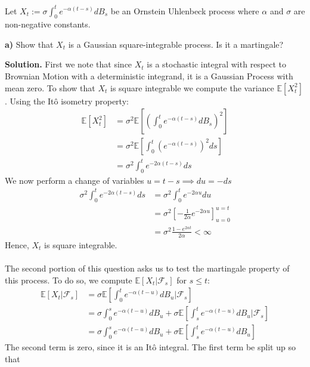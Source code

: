 \documentclass{article}
\begin{document}
\begin{tcolorbox}
[colframe=black,colback=gray!5,boxrule=0.5pt]
 Let $X_t := \sigma\int_0^t e^{-\alpha(t-s)}dB_s$ be an Ornstein Uhlenbeck process where $\alpha$ and $\sigma$ are non-negative constants. 
\end{tcolorbox}
\begin{tcolorbox}
[colframe=black,colback=gray!5,boxrule=0.5pt]
 \textbf{a)} Show that $X_t$ is a Gaussian square-integrable process. Is it a martingale? 
\end{tcolorbox}
\textbf{Solution.} First we note that since $X_t$ is a stochastic integral with respect to Brownian Motion with a deterministic integrand, it is a Gaussian Process with mean zero. To show that $X_t$ is square integrable we compute the variance $\mathbb{E}[X_t^2]$. Using the Itô isometry property:
\begin{align*}
    \mathbb{E}[X_t^2] &= \sigma^2 \mathbb{E}\left[\left(\int_0^t e^{-\alpha(t-s)}dB_s\right)^2\right] \\
    &= \sigma^2 \mathbb{E}\left[\int_0^t (e^{-\alpha(t-s)})^2ds\right] \\
    &= \sigma^2 \int_0^t e^{-2\alpha(t-s)}ds
\end{align*}
We now perform a change of variables $u = t-s \implies du = -ds$
\begin{align*}
    \sigma^2 \int_0^t e^{-2\alpha(t-s)}ds &= \sigma^2 \int_0^t e^{-2\alpha u}du \\
    &=\sigma^2 \left[-\frac{1}{2\alpha}e^{-2\alpha u}\right]_{u=0}^{u=t} \\
    &= \sigma^2\frac{1-e^{2\alpha t}}{2\alpha} < \infty
\end{align*}
Hence, $X_t$ is square integrable. \\
\\
The second portion of this question asks us to test the martingale property of this process. To do so, we compute $\mathbb{E}[X_t | \mathcal{F}_s]$ for $s\leq t$: 
\begin{align*}
    \mathbb{E}[X_t | \mathcal{F}_s] &= \sigma \mathbb{E}\left[\int_0^t e^{-\alpha (t-u)}dB_u \big | \mathcal{F}_s\right] \\
    &= \sigma\int_0^s e^{-\alpha (t-u)}dB_u   + \sigma \mathbb{E}\left[\int_s^t e^{-\alpha (t-u)}dB_u \big | \mathcal{F}_s\right] \\
    &= \sigma\int_0^s e^{-\alpha (t-u)}dB_u   + \sigma \mathbb{E}\left[\int_s^t e^{-\alpha (t-u)}dB_u \right]
\end{align*}
The second term is zero, since it is an Itô integral. The first term be split up so that 
\end{document}

